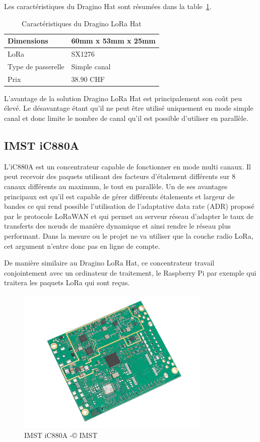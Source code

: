 Les caractéristiques du Dragino Hat sont résumées dans la table~\ref{tab:dragino_cara}.

\begin{table}[htb]
\caption[Dragino Hat Caractéristiques]{Caractéristiques du Dragino LoRa Hat}
\label{tab:dragino_cara}
\centering
\begin{tabular}{ l | l }
\toprule
Dimensions & 60mm x 53mm x 25mm \\
\midrule
LoRa & SX1276 \\
\midrule
Type de passerelle & Simple canal \\
\midrule
Prix & 38.90 CHF \\
\bottomrule
\end{tabular}
\end{table}

L’avantage de la solution Dragino LoRa Hat est principalement son coût peu élevé. Le désavantage étant qu’il ne peut être utilisé uniquement en mode simple canal et donc limite le nombre de canal qu’il est possible d’utiliser en parallèle.

\subsection {IMST iC880A}

L’iC880A est un concentrateur capable de fonctionner en mode multi canaux. Il peut recevoir des paquets utilisant des facteurs d’étalement différents sur 8 canaux différents au maximum, le tout en parallèle. Un de ses avantages principaux est qu’il est capable de gérer différents étalements et largeur de bandes ce qui rend possible l’utilisation de l’adaptative data rate (ADR) proposé par le protocole LoRaWAN et qui permet au serveur réseau d’adapter le taux de transferts des nœuds de manière dynamique et ainsi rendre le réseau plus performant. Dans la mesure ou le projet ne va utiliser que la couche radio LoRa, cet argument n’entre donc pas en ligne de compte.

De manière similaire au Dragino LoRa Hat, ce concentrateur travail conjointement avec un ordinateur de traitement, le Raspberry Pi par exemple qui traitera les paquets LoRa qui sont reçus.

\begin{figure}[htb]
\centering 
\includegraphics[width=0.5\columnwidth]{../images/iC880A.png} 
\caption[IMST iC880A]{IMST iC880A -© IMST}
\label{fig:imst_ic880a}
\end{figure}

